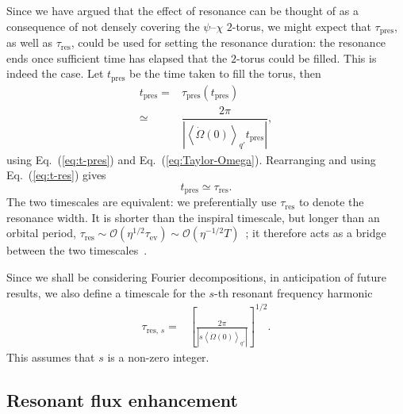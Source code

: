 \documentclass[aps,prd,amsfonts,amssymb,amsmath,nofootinbib,showpacs,superscriptaddress,twocolumn,floatfix]{revtex4-1}
\newcommand{\eqnref}[1]{Eq.~(\ref{eq:#1})}
\newcommand{\sub}[1]{\ensuremath{_\mathrm{#1}}}
\newcommand{\order}[1]{\ensuremath{\mathcal{O}({#1})}}
\begin{document}
Since we have argued that the effect of resonance can be thought of as a consequence of not densely covering the $\psi$--$\chi$ $2$-torus, we might expect that $\tau\sub{pres}$, as well as $\tau\sub{res}$, could be used for setting the resonance duration: the resonance ends once sufficient time has elapsed that the $2$-torus could be filled. This is indeed the case. Let $t\sub{pres}$ be the time taken to fill the torus, then
\begin{align}
t\sub{pres} = {} & \tau\sub{pres}(t\sub{pres}) \\
 \simeq {} & \dfrac{2\pi}{\left|\left\langle\dot{\Omega}(0)\right\rangle_{q'} t\sub{pres}\right|}, \nonumber 
\end{align}
using \eqnref{t-pres} and \eqnref{Taylor-Omega}. Rearranging and using \eqnref{t-res} gives
\begin{equation}
t\sub{pres} \simeq \tau\sub{res}.
\end{equation}
The two timescales are equivalent: we preferentially use $\tau\sub{res}$ to denote the resonance width. It is shorter than the inspiral timescale, but longer than an orbital period, $\tau\sub{res} \sim \order{\eta^{1/2}\tau\sub{ev}} \sim \order{\eta^{-1/2}T}$~\cite{Flanagan2012,Gair2011a}; it therefore acts as a bridge between the two timescales~\cite{Hinderer2008}.

Since we shall be considering Fourier decompositions, in anticipation of future results, we also define a timescale for the $s$-th resonant frequency harmonic
\begin{align}
\tau_{\mathrm{res},\,s} = {} & \left[\frac{2\pi}{\left|s\left\langle \dot{\Omega}(0)\right\rangle_{q'}\right|}\right]^{1/2}.
\label{eq:T-res-s}
\end{align}
This assumes that $s$ is a non-zero integer.

\subsection{Resonant flux enhancement}
\label{sec:flux-enhance}
\end{document}
